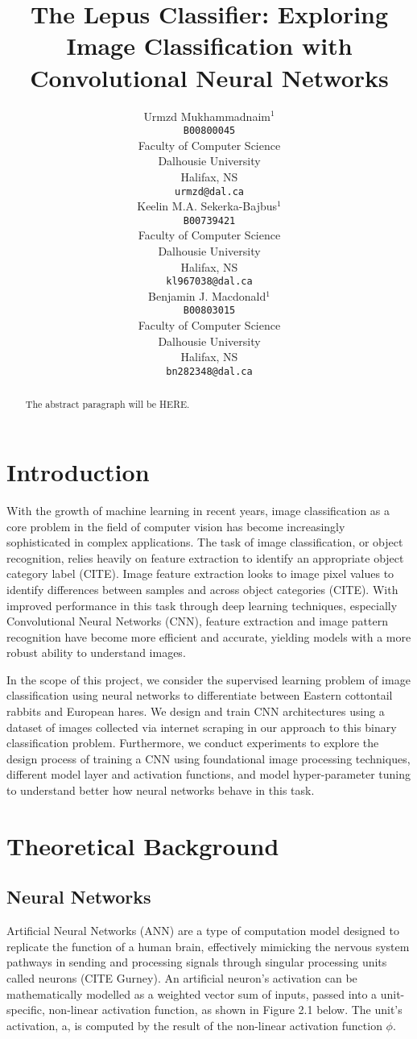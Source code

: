 \documentclass{article}
\title{The Lepus Classifier: Exploring Image Classification with Convolutional Neural Networks}
\author{%
  Urmzd
  Mukhammadnaim$^1$\\
  \texttt{B00800045}\\
  Faculty of Computer Science\\
  Dalhousie University\\
  Halifax, NS  \\
  \texttt{urmzd@dal.ca} \\
  \And
  Keelin M.A.
  Sekerka-Bajbus$^1$\\
  \texttt{B00739421}\\
  Faculty of Computer Science\\
  Dalhousie University\\
  Halifax, NS  \\
  \texttt{kl967038@dal.ca} \\
  \AND
  Benjamin J. Macdonald$^1$ \\
  \texttt{B00803015}\\
  Faculty of Computer Science\\
  Dalhousie University\\
  Halifax, NS  \\
  \texttt{bn282348@dal.ca} \\
}
\begin{document}
\maketitle

\begin{abstract}
  The abstract paragraph will be HERE.
\end{abstract}

\section{Introduction}
With the growth of machine learning in recent years, image classification as a core problem in the field of computer vision has become increasingly sophisticated in complex applications. The task of image classification, or object recognition, relies heavily on feature extraction to identify an appropriate object category label (CITE). Image feature extraction looks to image pixel values to identify differences between samples and across object categories (CITE). With improved performance in this task through deep learning techniques, especially Convolutional Neural Networks (CNN), feature extraction and image pattern recognition have become more efficient and accurate, yielding models with a more robust ability to understand images.

In the scope of this project, we consider the supervised learning problem of image classification using neural networks to differentiate between Eastern cottontail rabbits and European hares. We design and train CNN architectures using a dataset of images collected via internet scraping in our approach to this binary classification problem. Furthermore, we conduct experiments to explore the design process of training a CNN using foundational image processing techniques, different model layer and activation functions, and model hyper-parameter tuning to understand better how neural networks behave in this task.

\section{Theoretical Background}
\subsection{Neural Networks}
Artificial Neural Networks (ANN) are a type of computation model designed to replicate the function of a human brain, effectively mimicking the nervous system pathways in sending and processing signals through singular processing units called neurons (CITE Gurney). An artificial neuron’s activation can be mathematically modelled as a weighted vector sum of inputs, passed into a unit-specific, non-linear activation function, as shown in Figure 2.1 below. The unit’s activation, a, is computed by the result of the non-linear activation function $\phi$.
\end{document}
